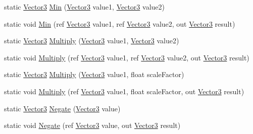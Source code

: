 \begin{DoxyCompactItemize}
\item 
static \hyperlink{structMicrosoft_1_1Xna_1_1Framework_1_1Vector3}{Vector3} \hyperlink{structMicrosoft_1_1Xna_1_1Framework_1_1Vector3_ad68b9cac999d7ac52283ff2288436fa0}{Min} (\hyperlink{structMicrosoft_1_1Xna_1_1Framework_1_1Vector3}{Vector3} value1, \hyperlink{structMicrosoft_1_1Xna_1_1Framework_1_1Vector3}{Vector3} value2)
\item 
static void \hyperlink{structMicrosoft_1_1Xna_1_1Framework_1_1Vector3_a22ebcfd525ef6ad10febd2441c1d38da}{Min} (ref \hyperlink{structMicrosoft_1_1Xna_1_1Framework_1_1Vector3}{Vector3} value1, ref \hyperlink{structMicrosoft_1_1Xna_1_1Framework_1_1Vector3}{Vector3} value2, out \hyperlink{structMicrosoft_1_1Xna_1_1Framework_1_1Vector3}{Vector3} result)
\item 
static \hyperlink{structMicrosoft_1_1Xna_1_1Framework_1_1Vector3}{Vector3} \hyperlink{structMicrosoft_1_1Xna_1_1Framework_1_1Vector3_acce373c58c9f51de15bfa13245262888}{Multiply} (\hyperlink{structMicrosoft_1_1Xna_1_1Framework_1_1Vector3}{Vector3} value1, \hyperlink{structMicrosoft_1_1Xna_1_1Framework_1_1Vector3}{Vector3} value2)
\item 
static void \hyperlink{structMicrosoft_1_1Xna_1_1Framework_1_1Vector3_ab1e0ed9569ec9fd6f2b9adbb7da9bbdf}{Multiply} (ref \hyperlink{structMicrosoft_1_1Xna_1_1Framework_1_1Vector3}{Vector3} value1, ref \hyperlink{structMicrosoft_1_1Xna_1_1Framework_1_1Vector3}{Vector3} value2, out \hyperlink{structMicrosoft_1_1Xna_1_1Framework_1_1Vector3}{Vector3} result)
\item 
static \hyperlink{structMicrosoft_1_1Xna_1_1Framework_1_1Vector3}{Vector3} \hyperlink{structMicrosoft_1_1Xna_1_1Framework_1_1Vector3_a26c8fee7b8b9a6f82d0344b9a82232c4}{Multiply} (\hyperlink{structMicrosoft_1_1Xna_1_1Framework_1_1Vector3}{Vector3} value1, float scale\+Factor)
\item 
static void \hyperlink{structMicrosoft_1_1Xna_1_1Framework_1_1Vector3_a814f38e8f2e1ba2e71e3e4dfeb5a3258}{Multiply} (ref \hyperlink{structMicrosoft_1_1Xna_1_1Framework_1_1Vector3}{Vector3} value1, float scale\+Factor, out \hyperlink{structMicrosoft_1_1Xna_1_1Framework_1_1Vector3}{Vector3} result)
\item 
static \hyperlink{structMicrosoft_1_1Xna_1_1Framework_1_1Vector3}{Vector3} \hyperlink{structMicrosoft_1_1Xna_1_1Framework_1_1Vector3_ab1229520f5c2482fa07ff5bff62d1d08}{Negate} (\hyperlink{structMicrosoft_1_1Xna_1_1Framework_1_1Vector3}{Vector3} value)
\item 
static void \hyperlink{structMicrosoft_1_1Xna_1_1Framework_1_1Vector3_acf7b2291fc341f7b898645e5cf5d87d4}{Negate} (ref \hyperlink{structMicrosoft_1_1Xna_1_1Framework_1_1Vector3}{Vector3} value, out \hyperlink{structMicrosoft_1_1Xna_1_1Framework_1_1Vector3}{Vector3} result)

\end{DoxyCompactItemize}
